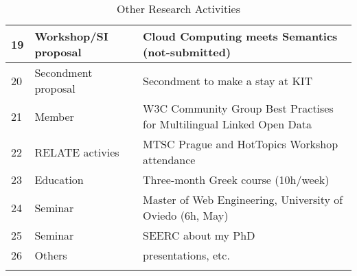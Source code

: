 \begin{longtable}[c]{|l|p{3.5cm}|p{10cm}|}
  19&Workshop/SI proposal&Cloud Computing meets Semantics (not-submitted) \\ \hline
  20&Secondment proposal&Secondment to make a stay at KIT \\ \hline
  21&Member&W3C Community Group Best Practises for Multilingual Linked Open Data \\ \hline
  22&RELATE activies&MTSC Prague and HotTopics Workshop attendance \\ \hline
  23&Education&Three-month Greek course (10h/week) \\ \hline
  24&Seminar&Master of Web Engineering, University of Oviedo (6h, May) \\ \hline
  25&Seminar&SEERC about my PhD \\ \hline
  26&Others&presentations, etc. \\ \hline
  \hline
  \caption{Other Research Activities}
  \label{table:other-research-activivies}
\end{longtable}



\normalsize
